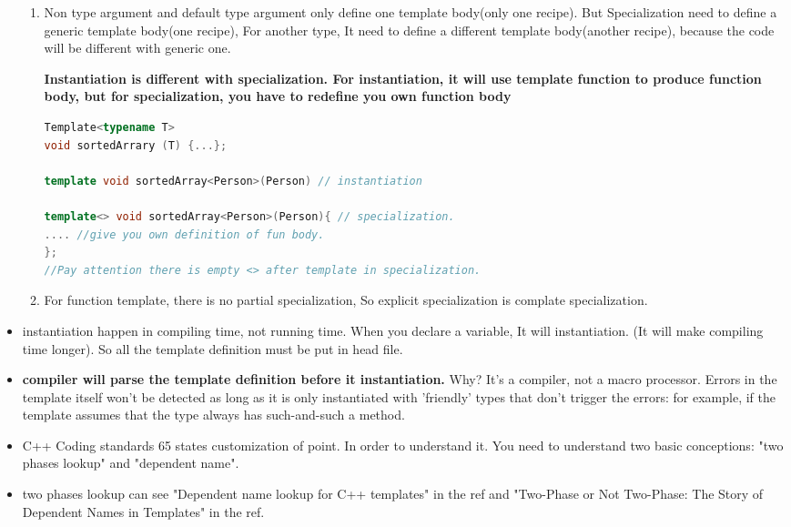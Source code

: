 \documentclass[a4paper,11pt,twoside]{book}
\begin{document}
\begin{itemize}
\begin{enumerate}
	\item Non type argument and default type argument only define one template body(only one recipe). But Specialization need to define a generic template body(one recipe), For another type, It need to define a different template body(another recipe), because the code will be different with generic one.
	 
	 \textbf{Instantiation is different with specialization.  For instantiation, it will use template function to produce function body, but for specialization, you have to redefine you own function body }
	 
\begin{lstlisting}[frame=single, language=c++]
Template<typename T>
void sortedArrary (T) {...};

template void sortedArray<Person>(Person) // instantiation

template<> void sortedArray<Person>(Person){ // specialization.
.... //give you own definition of fun body.
};
//Pay attention there is empty <> after template in specialization.
\end{lstlisting}


	\item For function template, there is no partial specialization, So explicit specialization is complate specialization.
\end{enumerate}


\item instantiation happen in compiling time, not running time. When you declare a variable, It will instantiation. (It will make compiling time longer). So all the template definition must be put in head file. 
	
\item \textbf{compiler will parse the template definition before it instantiation.} Why? It's a compiler, not a macro processor. Errors in the template itself won't be detected as long as it is only instantiated with 'friendly' types that don't trigger the errors: for example, if the template assumes that the type always has such-and-such a method.

\item C++ Coding standards 65 states customization of point. In order to understand it. You need to understand two basic conceptions: "two phases lookup" and "dependent name".  

\item two phases lookup can see "Dependent name lookup for C++ templates" in the ref and "Two-Phase or Not Two-Phase: The Story of Dependent Names in Templates" in the ref.
\end{itemize}
\end{document}
